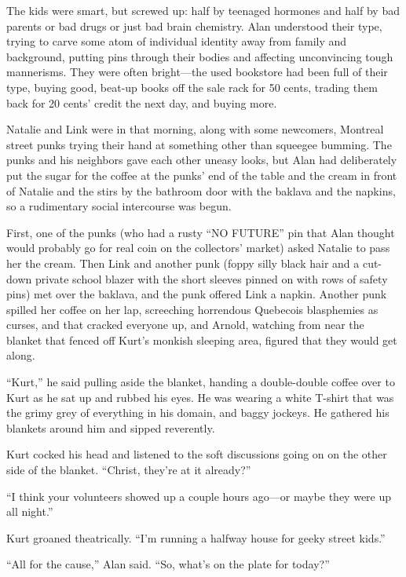 \documentclass{article}
\begin{document}
The kids were smart, but screwed up:  half by teenaged hormones and
half by bad parents or bad drugs or just bad brain chemistry.  Alan
understood their type, trying to carve some atom of individual
identity away from family and background, putting pins through their
bodies and affecting unconvincing tough mannerisms.  They were often
bright---the used bookstore had been full of their type, buying good,
beat-up books off the sale rack for 50 cents, trading them back for 20
cents' credit the next day, and buying more.

Natalie and Link were in that morning, along with some newcomers,
Montreal street punks trying their hand at something other than
squeegee bumming.  The punks and his neighbors gave each other uneasy
looks, but Alan had deliberately put the sugar for the coffee at the
punks' end of the table and the cream in front of Natalie and the
stirs by the bathroom door with the baklava and the napkins, so a
rudimentary social intercourse was begun.

First, one of the punks (who had a rusty ``NO FUTURE'' pin that Alan
thought would probably go for real coin on the collectors' market)
asked Natalie to pass her the cream.  Then Link and another punk
(foppy silly black hair and a cut-down private school blazer with the
short sleeves pinned on with rows of safety pins) met over the
baklava, and the punk offered Link a napkin.  Another punk spilled her
coffee on her lap, screeching horrendous Quebecois blasphemies as
curses, and that cracked everyone up, and Arnold, watching from near
the blanket that fenced off Kurt's monkish sleeping area, figured that
they would get along.

``Kurt,'' he said pulling aside the blanket, handing a double-double
coffee over to Kurt as he sat up and rubbed his eyes.  He was wearing
a white T-shirt that was the grimy grey of everything in his domain,
and baggy jockeys.  He gathered his blankets around him and sipped
reverently.

Kurt cocked his head and listened to the soft discussions going on on
the other side of the blanket.  ``Christ, they're at it already?''

``I think your volunteers showed up a couple hours ago---or maybe they
were up all night.''

Kurt groaned theatrically.  ``I'm running a halfway house for geeky
street kids.''

``All for the cause,'' Alan said.  ``So, what's on the plate for
today?''
\end{document}
